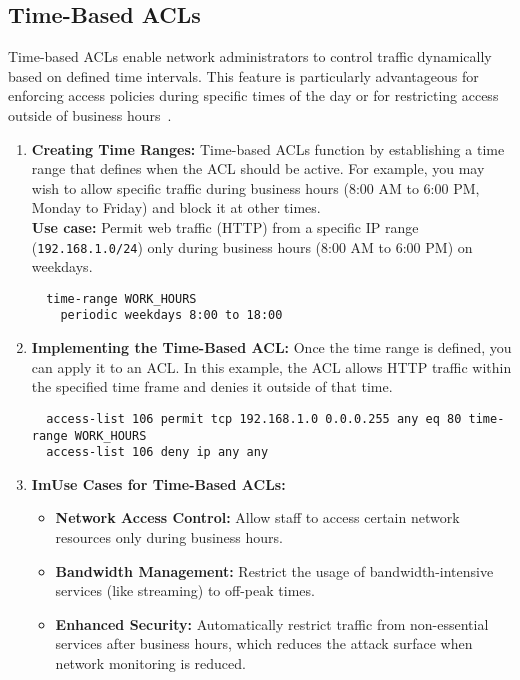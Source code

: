 \documentclass[11pt,a4paper]{article}
\begin{document}
    \subsection*{Time-Based ACLs}
        Time-based ACLs enable network administrators to control traffic dynamically based on defined time intervals. This feature is particularly advantageous for enforcing access policies during specific times of the day or for restricting access outside of business hours~\cite{Time-Based}.
            \begin{enumerate}
                \item \textbf{Creating Time Ranges:} Time-based ACLs function by establishing a time range that defines when the ACL should be active. For example, you may wish to allow specific traffic during business hours (8:00 AM to 6:00 PM, Monday to Friday) and block it at other times.
                \\[1em]
                \textbf{Use case:} Permit web traffic (HTTP) from a specific IP range (\lstinline{192.168.1.0/24}) only during business hours (8:00 AM to 6:00 PM) on weekdays.
\begin{lstlisting}
  time-range WORK_HOURS
    periodic weekdays 8:00 to 18:00                                                            
\end{lstlisting}
                \item \textbf{Implementing the Time-Based ACL:} Once the time range is defined, you can apply it to an ACL. In this example, the ACL allows HTTP traffic within the specified time frame and denies it outside of that time.
\begin{lstlisting}
  access-list 106 permit tcp 192.168.1.0 0.0.0.255 any eq 80 time-range WORK_HOURS
  access-list 106 deny ip any any                                                                              
\end{lstlisting}
                \item \textbf{ImUse Cases for Time-Based ACLs:}
                    \begin{itemize}
                        \item \textbf{Network Access Control:} Allow staff to access certain network resources only during business hours.

                        \item \textbf{Bandwidth Management:} Restrict the usage of bandwidth-intensive services (like streaming) to off-peak times.

                        \item \textbf{Enhanced Security:} Automatically restrict traffic from non-essential services after business hours, which reduces the attack surface when network monitoring is reduced.

                    \end{itemize}
            \end{enumerate}
\end{document}
